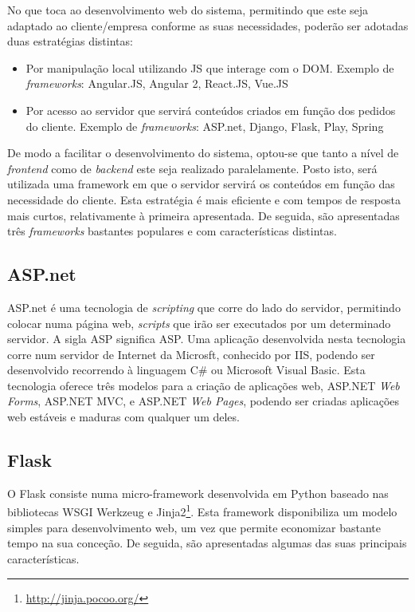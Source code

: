 No que toca ao desenvolvimento web do sistema, permitindo que este seja adaptado ao cliente/empresa conforme as suas necessidades, poderão ser adotadas duas estratégias distintas: 

\begin{itemize}
	\item Por manipulação local utilizando \ac{JS} que interage com o \ac{DOM}. Exemplo de \textit{frameworks}: Angular.JS, Angular 2, React.JS, Vue.JS
	
	\item Por acesso ao servidor que servirá conteúdos criados em função dos pedidos do cliente. Exemplo de \textit{frameworks}: ASP.net, Django, Flask, Play, Spring
	
\end{itemize}


De modo a facilitar o desenvolvimento do sistema, optou-se que tanto  a nível de \textit{frontend} como de \textit{backend} este seja realizado paralelamente. Posto isto, será utilizada uma framework em que o servidor servirá os conteúdos em função das necessidade do cliente. Esta estratégia é mais eficiente e com tempos de resposta mais curtos, relativamente à primeira apresentada. De seguida, são apresentadas três \textit{frameworks} bastantes populares e com características distintas. 




\subsection{ASP.net}


ASP.net é uma tecnologia de \textit{scripting} que corre do lado do servidor, permitindo colocar numa página web, \textit{scripts} que irão ser executados por um determinado servidor. A sigla \acs{ASP} significa \acl{ASP}. Uma aplicação desenvolvida nesta tecnologia corre num servidor de Internet da Microsft, conhecido por \ac{IIS}, podendo ser desenvolvido recorrendo à linguagem C\# ou Microsoft Visual Basic. Esta tecnologia oferece três modelos para a criação de aplicações web, ASP.NET \textit{Web Forms}, ASP.NET \ac{MVC}, e ASP.NET \textit{Web Pages}, podendo ser criadas aplicações web estáveis e maduras com qualquer um deles\cite{Microsoft2016}. 


\subsection{Flask}


O Flask consiste numa micro-framework desenvolvida em Python baseado nas bibliotecas \ac{WSGI} Werkzeug e Jinja2\footnote{\url{http://jinja.pocoo.org/}}. Esta framework disponibiliza um  modelo simples para desenvolvimento web, um vez que permite economizar bastante tempo na sua conceção. De seguida, são apresentadas algumas das suas principais características\cite{Flask2014}. 


